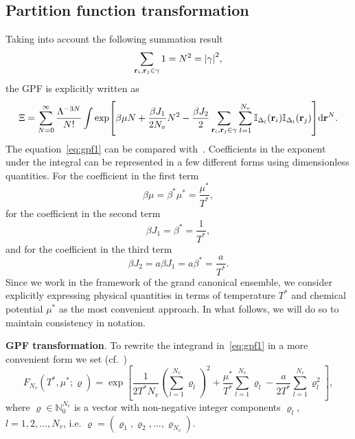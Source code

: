 \documentclass[12pt]{article}
\numberwithin{equation}{section}
\begin{document}
	\subsection{Partition function transformation}
	Taking into account the following summation result
	\begin{equation}
		\sum_{\vb{r}_i,\vb{r}_j \in \gamma} 1 = N^2 = \abs{\gamma}^2,
	\end{equation}
	the GPF is explicitly written as
	\begin{equation}
		\label{eq:gpf1}
		\Xi = \sum_{N=0}^{\infty} \frac{\Lambda^{-3N}}{N!}
		\int
		\exp[\beta\mu N + \frac{\beta J_1}{2N_{v}} N^2 - \frac{\beta J_2}{2} \sum_{\vb{r}_i,\vb{r}_j \in \gamma} \sum_{l=1}^{N_v} \mathbb{I}_{\Delta_l}(\vb{r}_i)\mathbb{I}_{\Delta_l}(\vb{r}_j)] {\rm d} \vb{r}^N.
	\end{equation}
	The equation~\eqref{eq:gpf1} can be compared with~\cite[(2.5)]{KKD20}. Coefficients in the exponent under the integral can be represented in a few different forms using dimensionless quantities. For the coefficient in the first term
	\begin{equation*}
		\beta\mu = \beta^*\mu^* = \frac{\mu^*}{T^*},
	\end{equation*}
	for the coefficient in the second term
	\begin{equation*}
		\beta J_1 = \beta^* = \frac{1}{T^*},
	\end{equation*}
	and for the coefficient in the third term
	\begin{equation*}
		\beta J_2 = a \beta J_1 = a \beta^* = \frac{a}{T^*}.
	\end{equation*}
	Since we work in the framework of the grand canonical ensemble, we consider explicitly expressing physical quantities in terms of temperature $T^*$ and chemical potential $\mu^*$ as the most convenient approach. In what follows, we will do so to maintain consistency in notation.
	
	\textbf{GPF transformation}. To rewrite the integrand in~\eqref{eq:gpf1} in a more convenient form we set (cf.~\cite[eq.~(2.7)]{KKD20})
	\begin{equation}
		\label{FNv1}
		F_{N_v}(T^*, \mu^*; \varrho) = \exp[\frac{1}{2T^*N_v}\left(\sum_{l=1}^{N_v} \varrho_l\right)^2 + \frac{\mu^*}{T^*}\sum_{l=1}^{N_v} \varrho_l - \frac{a}{2T^*} \sum_{l=1}^{N_v} \varrho_l^2],
	\end{equation}
	where $\varrho \in \mathbb{N}_0^{N_v}$ is a vector with non-negative integer components $\varrho_l$, $l=1, 2, \ldots , N_v$, i.e. $\varrho = (\varrho_1, \varrho_2, \ldots, \varrho_{N_{v}})$.
	
\end{document}
